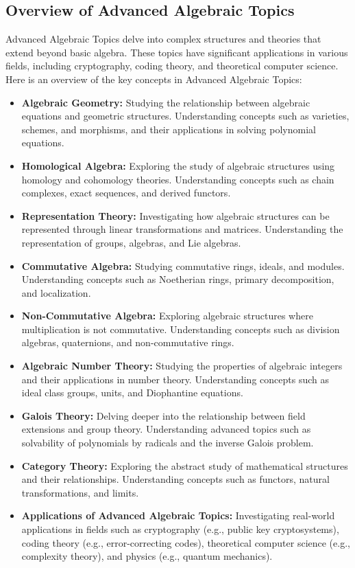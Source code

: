 \documentclass[openany]{book}
\begin{document}
\subsection{Overview of Advanced Algebraic Topics}
Advanced Algebraic Topics delve into complex structures and theories that extend beyond basic algebra. These topics have significant applications in various fields, including cryptography, coding theory, and theoretical computer science. Here is an overview of the key concepts in Advanced Algebraic Topics:
\begin{itemize}
    \item \textbf{Algebraic Geometry:} Studying the relationship between algebraic equations and geometric structures. Understanding concepts such as varieties, schemes, and morphisms, and their applications in solving polynomial equations.
    \item \textbf{Homological Algebra:} Exploring the study of algebraic structures using homology and cohomology theories. Understanding concepts such as chain complexes, exact sequences, and derived functors.
    \item \textbf{Representation Theory:} Investigating how algebraic structures can be represented through linear transformations and matrices. Understanding the representation of groups, algebras, and Lie algebras.
    \item \textbf{Commutative Algebra:} Studying commutative rings, ideals, and modules. Understanding concepts such as Noetherian rings, primary decomposition, and localization.
    \item \textbf{Non-Commutative Algebra:} Exploring algebraic structures where multiplication is not commutative. Understanding concepts such as division algebras, quaternions, and non-commutative rings.
    \item \textbf{Algebraic Number Theory:} Studying the properties of algebraic integers and their applications in number theory. Understanding concepts such as ideal class groups, units, and Diophantine equations.
    \item \textbf{Galois Theory:} Delving deeper into the relationship between field extensions and group theory. Understanding advanced topics such as solvability of polynomials by radicals and the inverse Galois problem.
    \item \textbf{Category Theory:} Exploring the abstract study of mathematical structures and their relationships. Understanding concepts such as functors, natural transformations, and limits.
    \item \textbf{Applications of Advanced Algebraic Topics:} Investigating real-world applications in fields such as cryptography (e.g., public key cryptosystems), coding theory (e.g., error-correcting codes), theoretical computer science (e.g., complexity theory), and physics (e.g., quantum mechanics).

\end{itemize}
\end{document}
